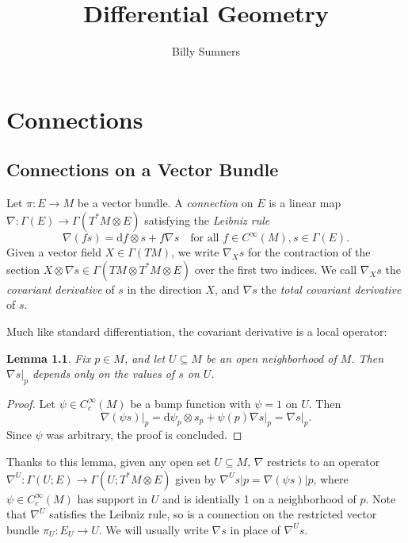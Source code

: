 \documentclass{book}
\title{Differential Geometry}
\author{Billy Sumners}
\renewcommand{\d}{\mathrm{d}}
\newtheorem{lemma}[theorem]{Lemma}
\theoremstyle{definition}
\numberwithin{equation}{section}
\begin{document}
\maketitle 

\tableofcontents

\chapter{Connections}
\section{Connections on a Vector Bundle}

Let $\pi \colon E \to M$ be a vector bundle. A \textit{connection} on $E$ is a linear map $\nabla \colon \Gamma(E) \to \Gamma(T^*M \otimes E)$ satisfying the \textit{Leibniz rule}
\begin{equation}
    \nabla(fs) = \d f \otimes s + f \nabla s \quad \text{for all } f \in C^\infty(M), s \in \Gamma(E).
\end{equation}
Given a vector field $X \in \Gamma(TM)$, we write $\nabla_X s$ for the contraction of the section $X \otimes \nabla s \in \Gamma(TM \otimes T^*M \otimes E)$ over the first two indices. We call $\nabla_X s$ the \textit{covariant derivative} of $s$ in the direction $X$, and $\nabla s$ the \textit{total covariant derivative} of $s$.

Much like standard differentiation, the covariant derivative is a local operator:
\begin{lemma}
    Fix $p \in M$, and let $U \subseteq M$ be an open neighborhood of $M$. Then $\nabla s \vert_p$ depends only on the values of $s$ on $U$.
\end{lemma}
\begin{proof}
    Let $\psi \in C^\infty_c(M)$ be a bump function with $\psi = 1$ on $U$. Then 
    \begin{equation}
        \nabla(\psi s) \vert_p = \d\psi_p \otimes s_p + \psi(p) \nabla s \vert_p = \nabla s \vert_p.
    \end{equation}
    Since $\psi$ was arbitrary, the proof is concluded.
\end{proof}
Thanks to this lemma, given any open set $U \subseteq M$, $\nabla$ restricts to an operator $\nabla^U \colon \Gamma(U;E) \to \Gamma(U;T^*M \otimes E)$ given by $\nabla^U s \vert p = \nabla(\psi s) \vert p$, where $\psi \in C_c^\infty(M)$ has support in $U$ and is identially 1 on a neighborhood of $p$. Note that $\nabla^U$ satisfies the Leibniz rule, so is a connection on the restricted vector bundle $\pi_U \colon E_U \to U$. We will usually write $\nabla s$ in place of $\nabla^U s$.
\end{document}
